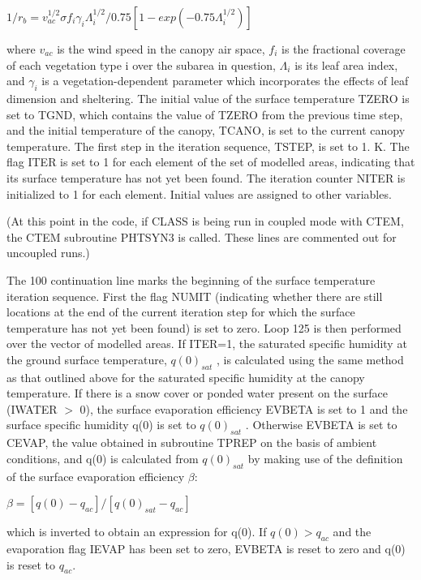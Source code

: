 $1/r_b = v_{ac}^{1/2} \sigma f_i \gamma_i \Lambda_i^{1/2} /0.75 [1 - exp(-0.75 \Lambda_i^{1/2})]$

where $v_{ac}$ is the wind speed in the canopy air space, $f_i$ is the fractional coverage of each vegetation type i over the subarea in question, $\Lambda_i$ is its leaf area index, and $\gamma_i$ is a vegetation-\/dependent parameter which incorporates the effects of leaf dimension and sheltering. The initial value of the surface temperature T\+Z\+E\+R\+O is set to T\+G\+N\+D, which contains the value of T\+Z\+E\+R\+O from the previous time step, and the initial temperature of the canopy, T\+C\+A\+N\+O, is set to the current canopy temperature. The first step in the iteration sequence, T\+S\+T\+E\+P, is set to 1. K. The flag I\+T\+E\+R is set to 1 for each element of the set of modelled areas, indicating that its surface temperature has not yet been found. The iteration counter N\+I\+T\+E\+R is initialized to 1 for each element. Initial values are assigned to other variables.

(At this point in the code, if C\+L\+A\+S\+S is being run in coupled mode with C\+T\+E\+M, the C\+T\+E\+M subroutine P\+H\+T\+S\+Y\+N3 is called. These lines are commented out for uncoupled runs.)

The 100 continuation line marks the beginning of the surface temperature iteration sequence. First the flag N\+U\+M\+I\+T (indicating whether there are still locations at the end of the current iteration step for which the surface temperature has not yet been found) is set to zero. Loop 125 is then performed over the vector of modelled areas. If I\+T\+E\+R=1, the saturated specific humidity at the ground surface temperature, $q(0)_{sat}$ , is calculated using the same method as that outlined above for the saturated specific humidity at the canopy temperature. If there is a snow cover or ponded water present on the surface (I\+W\+A\+T\+E\+R $>$ 0), the surface evaporation efficiency E\+V\+B\+E\+T\+A is set to 1 and the surface specific humidity q(0) is set to $q(0)_{sat}$ . Otherwise E\+V\+B\+E\+T\+A is set to C\+E\+V\+A\+P, the value obtained in subroutine T\+P\+R\+E\+P on the basis of ambient conditions, and q(0) is calculated from $q(0)_{sat}$ by making use of the definition of the surface evaporation efficiency $\beta$\+:

$\beta = [q(0) - q_{ac} ]/[q(0)_{sat} - q_{ac} ]$

which is inverted to obtain an expression for q(0). If $q(0) > q_{ac}$ and the evaporation flag I\+E\+V\+A\+P has been set to zero, E\+V\+B\+E\+T\+A is reset to zero and q(0) is reset to $q_{ac}$.

